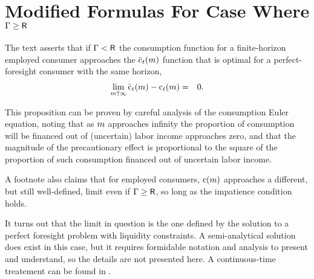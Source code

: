 \message{ !name(TractableBufferStock.tex)}\documentclass{handout}
\begin{document}
\section{Modified Formulas For Case Where $\Gamma \geq \mathsf{R}$} \label{sec:PGroGEQRfree}

The text asserts that if $\Gamma < \mathsf{R}$ the consumption function for a finite-horizon employed consumer approaches
the $\bar{\mathrm{c}}_{t}(m)$ function that is optimal for a perfect-foresight
consumer with the same horizon,
\begin{eqnarray}
  \lim_{m \uparrow \infty} \bar{\mathrm{c}}_{t}(m) - \mathrm{c}_{t}(m) & = & 0
.
\end{eqnarray}

This proposition can be proven by careful analysis of the consumption Euler equation,
noting that as $m$ approaches infinity the proportion of consumption will
be financed out of (uncertain) labor income approaches zero, and that the magnitude
of the precautionary effect is proportional to the square of the proportion of such
consumption financed out of uncertain labor income.

A footnote also claims that for employed consumers, $\mathrm{c}(m)$
approaches a different, but still well-defined, limit even if $\Gamma
\geq \mathsf{R}$, so long as the impatience condition holds.

It turns out that the limit in question is the one defined by the solution to a
perfect foresight problem with liquidity constraints.  A semi-analytical solution does
exist in this case, but it requires formidable notation and analysis to present and
understand, so the details are not presented here.  A continuous-time treatement
can be found in \cite{parkLiqConstrContinuous}.

\pagebreak

\end{document}
